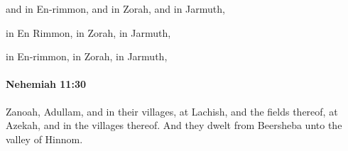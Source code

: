 			\begin{versebox}
					\item[BHS] 
					\item[ASV] and in En-rimmon, and in Zorah, and in Jarmuth,
					\item[NIV] in En Rimmon, in Zorah, in Jarmuth,
					\item[NRSV] in En-rimmon, in Zorah, in Jarmuth,
			\end{versebox}

		\paragraph{Nehemiah 11:30} %
			\label{NEHEMIAH-11-30}

			Zanoah, Adullam, and in their villages, at Lachish, and the fields thereof, at Azekah, and in the villages thereof. And they dwelt from Beersheba unto the valley of Hinnom.

